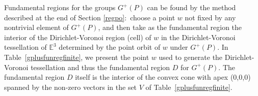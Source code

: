\documentclass[12pt]{article}
\theoremstyle{definition}\newtheorem{definition}{Definition}[section]
\begin{document}

Fundamental regions for the groups $G^{+}(P)$ can be found by the method described at the end of Section \ref{regpo}:\ choose a point $w$ not fixed by any nontrivial element of $G^+(P)$, and then take as the fundamental region the interior of the Dirichlet-Voronoi region (cell) of $w$ in the Dirichlet-Voronoi tessellation of $\mathbb{E}^3$ determined by the point orbit of $w$ under $G^+(P)$. In Table~\ref{gplusfunregfinite}, we present the point $w$ used to generate the Dirichlet-Voronoi tessellation and thus the fundamental region $D$ for $G^+(P)$. The fundamental region $D$ itself is the interior of the convex cone with apex (0,0,0) spanned by the non-zero vectors in the set $V$ of Table~\ref{gplusfunregfinite}. 
\end{document}
